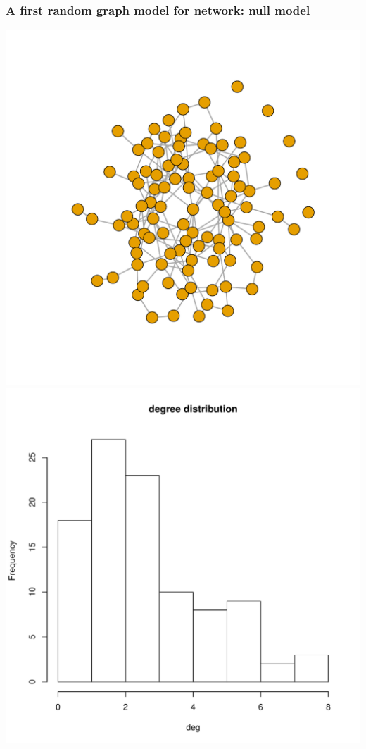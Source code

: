 \documentclass[compress,10pt]{beamer}
\begin{document}
\begin{frame}
\frametitle{A first random graph model for network: null model}

\begin{center}
 \includegraphics[scale=.3]{plots/ER.pdf} \includegraphics[scale=.3]{plots/degER.pdf}
\end{center}



\end{frame}
\end{document}
